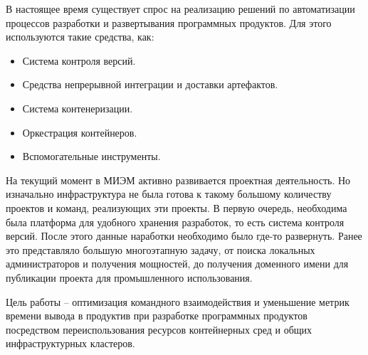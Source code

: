 \Introduction

В настоящее время существует спрос на реализацию решений по автоматизации процессов разработки и развертывания программных продуктов. Для этого используются такие средства, как:

\begin{itemize}
    \item Система контроля версий.
    \item Средства непрерывной интеграции и доставки артефактов.
    \item Система контенеризации.
    \item Оркестрация контейнеров.
    \item Вспомогательные инструменты.
\end{itemize}

На текущий момент в МИЭМ активно развивается проектная деятельность. Но изначально инфраструктура не была готова к такому большому количеству проектов и команд, реализующих эти проекты. В первую очередь, необходима была платформа для удобного хранения разработок, то есть система контроля версий. После этого данные наработки необходимо было где-то развернуть. Ранее это представляло большую многоэтапную задачу, от поиска локальных администраторов и получения мощностей, до получения доменного имени для публикации проекта для промышленного использования.

Цель работы -- оптимизация командного взаимодействия и уменьшение метрик времени вывода в продуктив при разработке программных продуктов посредством переиспользования ресурсов контейнерных сред и общих инфраструктурных кластеров.
